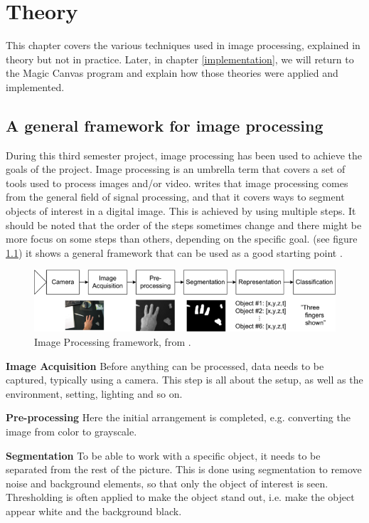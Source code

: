 \chapter{Theory}\label{theory_part}
This chapter covers the various techniques used in image processing, explained in theory but not in practice. Later, in chapter \ref{implementation}, we will return to the Magic Canvas program and explain how those theories were applied and implemented.

\section{A general framework for image processing}
During this third semester project, image processing has been used to achieve the goals of the project.
Image processing is an umbrella term that covers a set of tools used to process images and/or video. \citep{ip_book} writes that image processing comes from the general field of signal processing, and that it covers ways to segment objects of interest in a digital image. This is achieved by using multiple steps. It should be noted that the order of the steps sometimes change and there might be more focus on some steps than others, depending on the specific goal. (see figure \ref{fig:ip_framework}) it shows a general framework that can be used as a good starting point \citep{ip_book}.

\begin{figure}[htbp]
\centering
\includegraphics[width=1.00\textwidth]{Pictures/Theory/imageProcessing_steps.png}
\caption{Image Processing framework, from \citep{ip_book}.}
\label{fig:ip_framework}
\end{figure}

\textbf{Image Acquisition}
Before anything can be processed, data needs to be captured, typically using a camera. This step is all about the setup, as well as the environment, setting, lighting and so on.

\textbf{Pre-processing}
Here the initial arrangement is completed, e.g. converting the image from color to grayscale.

\textbf{Segmentation}
To be able to work with a specific object, it needs to be separated from the rest of the picture. This is done using segmentation to remove noise and background elements, so that only the object of interest is seen. Thresholding is often applied to make the object stand out, i.e. make the object appear white and the background black.


